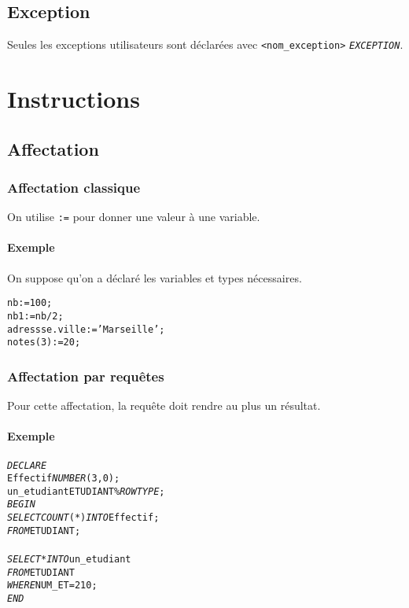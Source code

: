 \documentclass[10pt]{article}
\begin{document}
		\subsection{Exception}
			Seules les exceptions utilisateurs sont déclarées avec \texttt{<nom\_exception>} \emph{\texttt{EXCEPTION}}.
			
	\section{Instructions}
		\subsection{Affectation}
			\subsubsection{Affectation classique}
				On utilise \texttt{:=} pour donner une valeur à une variable.
				
				\paragraph{Exemple}
					On suppose qu'on a déclaré les variables et types nécessaires.
					\begin{alltt}
							nb:=100;
							nb1:=nb/2;
							adressse.ville:='Marseille';
							notes(3):=20;
					\end{alltt}
			\subsubsection{Affectation par requêtes}
				Pour cette affectation, la requête doit rendre au plus un résultat.
				
				\paragraph{Exemple}
					\begin{alltt}
						\begin{tabbing}
							\emph{DECLARE}\=\\
								\>Effectif \emph{NUMBER}(3,0);\\
								\>un_etudiant ETUDIANT\%\emph{ROWTYPE};\\
							\emph{BEGIN} \=\\
								\>\emph{SELECT}\= \emph{COUNT}(*) \emph{INTO} Effectif;\\
								\>\emph{FROM}\> ETUDIANT;\\
								\\
								\>\emph{SELECT}\> * \emph{INTO} un_etudiant\\
								\>\emph{FROM}\> ETUDIANT\\
								\>\emph{WHERE}\> NUM_ET=210;
							\emph{END}
						\end{tabbing}
					\end{alltt}
					
\end{document}
